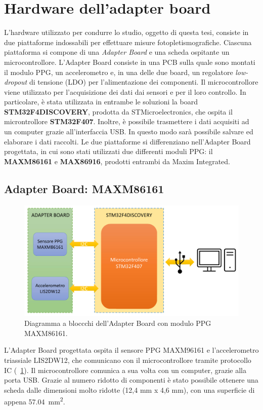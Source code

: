 \section{Hardware dell'adapter board}
L'hardware utilizzato per condurre lo studio, oggetto di questa tesi, consiste in due piattaforme indossabili per effettuare misure fotopletismografiche. Ciascuna piattaforma si compone di una \textit{Adapter Board} e una scheda ospitante un microcontrollore. L'Adapter Board consiste in una PCB sulla quale sono montati il modulo PPG, un accelerometro e, in una delle due board, un regolatore \textit{low-dropout} di tensione (LDO) per l'alimentazione dei componenti. Il microcontrollore viene utilizzato per l'acquisizione dei dati dai sensori e per il loro controllo. In particolare, è stata utilizzata in entrambe le soluzioni la board \textbf{STM32F4DISCOVERY}, prodotta da STMicroelectronics, che ospita il microntrollore \textbf{STM32F407}. Inoltre, è possibile trasmettere i dati acquisiti ad un computer grazie all'interfaccia USB. In questo modo sarà possibile salvare ed elaborare i dati raccolti.
Le due piattaforme si differenziano nell'Adapter Board progettata, in cui sono stati utilizzati due differenti moduli PPG: il \textbf{MAXM86161} e \textbf{MAX86916}, prodotti entrambi da Maxim Integrated.
\subsection{Adapter Board: MAXM86161}
\begin{figure}[b]
	\centering
	\includegraphics[width=0.6\linewidth]{ImageFiles/Hardware/DiagrammaBlocchiMAXM86161}
	\caption{Diagramma a bloccchi dell'Adapter Board con modulo PPG MAXM86161.}
	\label{fig:DiagrammaBlocchiMAXM86161}
\end{figure}
L'Adapter Board progettata ospita il sensore PPG MAXM96161 e l'accelerometro triassiale LIS2DW12, che comunicano con il microcontrollore tramite protocollo IC (\Fig~\ref{fig:DiagrammaBlocchiMAXM86161}). Il microcontrollore comunica a sua volta con un computer, grazie alla porta USB. Grazie al numero ridotto di componenti è stato possibile ottenere una scheda dalle dimensioni molto ridotte (12,4 mm x 4,6 mm), con una superficie di appena \SI{57.04}{\square\milli\meter}.

